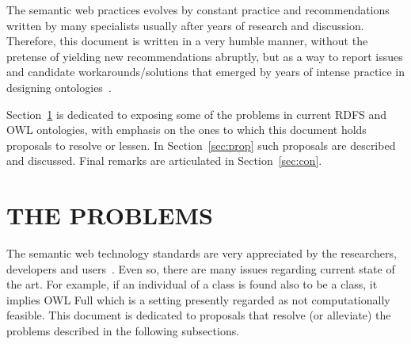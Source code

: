 \documentclass[12pt,fleqn]{article}
\begin{document}
The semantic web practices evolves by constant practice and recommendations written
by many specialists usually after years of research and discussion.
Therefore, this document is written in a very humble manner,
without the pretense of yielding new recommendations abruptly,
but as a way to report issues and candidate workarounds/solutions
that emerged by years of intense practice in designing ontologies~\citep{pnud5,fabbri1,losd,ops}.

Section~\ref{sec:prob} is dedicated to exposing some of the problems
in current RDFS and OWL ontologies, with emphasis on the ones
to which this document holds proposals to resolve or lessen.
In Section~\ref{sec:prop} such proposals are described and discussed.
Final remarks are articulated in Section~\ref{sec:con}.

\section{THE PROBLEMS}\label{sec:prob}
The semantic web technology standards are very appreciated by the researchers, developers and users~\citep{semApr}.
Even so, there are many issues regarding current state of the art.
For example, if an individual of a class is found also to be a class,
it implies OWL Full which is a setting presently regarded as not computationally feasible.
This document is dedicated to proposals that resolve (or alleviate)
the problems described in the following subsections.
\end{document}
